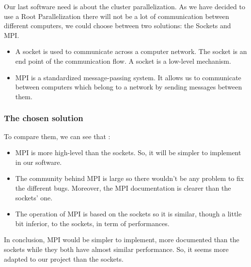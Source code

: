 Our last software need is about the cluster parallelization. As we have decided to use a Root Parallelization there will not be a lot of communication between different computers, we could choose between two solutions: the Sockets and MPI.
\begin{itemize}
\item A socket is used to communicate across a computer network. The socket is an end point of the communication flow. A socket is a low-level mechanism.
\item MPI is a standardized message-passing system. It allows us to communicate between computers which belong to a network by sending messages between them. 
\end{itemize}
\subsubsection{The chosen solution}

To compare them, we can see that :
\begin{itemize}
\item MPI is more high-level than the sockets. So, it will be simpler to implement in our software.
\item The community behind MPI is large so there wouldn't be any problem to fix the different bugs. Moreover, the MPI documentation is clearer than the sockets' one. 
\item The operation of MPI is based on the sockets so it is similar, though a little bit inferior, to the sockets, in term of performances.
\end{itemize}
In conclusion, MPI would be simpler to implement, more documented than the sockets while they both have almost similar performance. So, it seems more adapted to our project than the sockets.